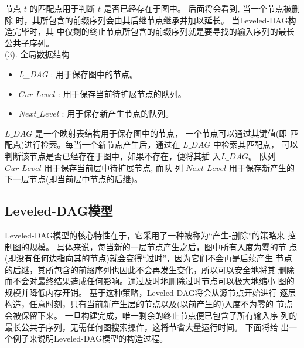 节点 $t$ 的匹配点用于判断 $t$ 是否已经存在于图中。 后面将会看到, 当一个节点被删除
时，其所包含的前缀序列会由其后继节点继承并加以延长。 当Leveled-DAG构造完毕时，其
中仅剩的终止节点所包含的前缀序列就是要寻找的输入序列的最长公共子序列。\\

(3). 全局数据结构
\label{sec:auxiliary}

\begin{itemize}
\item \emph{L\_DAG} : 用于保存图中的节点。
\item $Cur\_Level$ : 用于保存当前待扩展节点的队列。
\item $Next\_Level$ : 用于保存新产生节点的队列。
\end{itemize}



$L\_DAG$ 是一个映射表结构用于保存图中的节点， 一个节点可以通过其键值(即
匹配点)进行检索。每当一个新节点产生后，通过在 $L\_DAG$ 中检索其匹配点，
可以判断该节点是否已经存在于图中，如果不存在，便将其插
入$L\_DAG$。 队列 $Cur\_Level$ 用于保存当前层中待扩展节点, 而队
列 $Next\_Level$ 用于保存新产生的下一层节点(即当前层中节点的后继)。


\subsection{Leveled-DAG模型}
\label{sec:leveled DAG}

Leveled-DAG模型的核心特性在于，它采用了一种被称为“产生-删除”的策略来
控制图的规模。 具体来说，每当新的一层节点产生之后，图中所有入度为零的节
点(即没有任何边指向其的节点)就会变得“过时”，因为它们不会再是后续产生
节点的后继，其所包含的前缀序列也因此不会再发生变化，所以可以安全地将其
删除而不会对最终结果造成任何影响。通过及时地删除过时节点可以极大地缩小
图的规模并降低内存开销。 基于这种策略，Leveled-DAG将会从源节点开始进行
逐层构造，任意时刻，只有当前新产生层的节点以及(以前产生的)入度不为零的
节点会被保留下来。 一旦构建完成，唯一剩余的终止节点便已包含了所有输入序
列的最长公共子序列，无需任何图搜索操作，这将节省大量运行时间。 下面将给
出一个例子来说明Leveled-DAG模型的构造过程。

